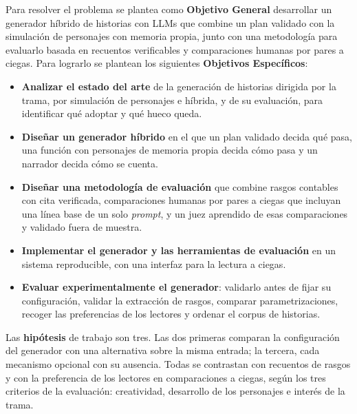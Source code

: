 \begin{introduction}
Para resolver el problema se plantea como \textbf{Objetivo General} desarrollar un generador
híbrido de historias con LLMs que combine un plan validado con la simulación de personajes con
memoria propia, junto con una metodología para evaluarlo basada en recuentos verificables y
comparaciones humanas por pares a ciegas. Para lograrlo se plantean los siguientes
\textbf{Objetivos Específicos}:

\begin{itemize}
  \item \textbf{Analizar el estado del arte} de la generación de historias dirigida por la trama,
  por simulación de personajes e híbrida, y de su evaluación, para identificar qué adoptar y qué
  hueco queda. %
  \item \textbf{Diseñar un generador híbrido} en el que un plan validado decida qué pasa, una
  función con personajes de memoria propia decida cómo pasa y un narrador decida cómo se
  cuenta. %
  \item \textbf{Diseñar una metodología de evaluación} que combine rasgos contables con cita
  verificada, comparaciones humanas por pares a ciegas que incluyan una línea base de un solo
  \textit{prompt}, y un juez aprendido de esas comparaciones y validado fuera de
  muestra. %
  \item \textbf{Implementar el generador y las herramientas de evaluación} en un sistema
  reproducible, con una interfaz para la lectura a ciegas. %
  \item \textbf{Evaluar experimentalmente el generador}: validarlo antes de fijar su configuración,
  validar la extracción de rasgos, comparar parametrizaciones, recoger las preferencias de los
  lectores y ordenar el corpus de historias. %
\end{itemize}

Las \textbf{hipótesis} de trabajo son tres. Las dos primeras comparan la configuración del
generador con una alternativa sobre la misma entrada; la tercera, cada mecanismo opcional con su
ausencia. Todas se contrastan con recuentos de rasgos y con la preferencia de los lectores en
comparaciones a ciegas, según los tres criterios de la evaluación: creatividad, desarrollo de los
personajes e interés de la trama.


\end{introduction}
